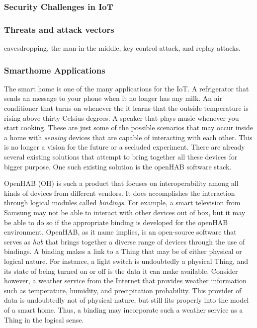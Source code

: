 \documentclass[12pt]{article}
\newcommand{\TODO}{\todo[inline]}
\begin{document}
\subsubsection{Security Challenges in IoT}

\subsubsection{Threats and attack vectors}

eavesdropping, the man-in-the middle, key control attack, and replay attacks.

\TODO{IoT Applications: smarthome, etc}

\subsubsection{Smarthome Applications}

The smart home is one of the many applications for the IoT. A refrigerator that sends an message to your phone when it no longer has any milk. An air conditioner that turns on whenever the it learns that the outside temperature is rising above thirty Celsius degrees. A speaker that plays music whenever you start cooking. These are just some of the possible scenarios that may occur inside a home with \emph{sensing} devices that are capable of interacting with each other. This is no longer a vision for the future or a secluded experiment. There are already several existing solutions that attempt to bring together all these devices for bigger purpose. One such existing solution is the openHAB software stack.

OpenHAB (OH) is such a product that focuses on interoperability among all kinds of devices from different vendors. It does accomplishes the interaction through logical modules called \emph{bindings}. For example, a smart television from Samsung may not be able to interact with other devices out of box, but it may be able to do so if the appropriate binding is developed for the openHAB environment. OpenHAB, as it name implies, is an open-source software that serves as \emph{hub} that brings together a diverse range of devices through the use of bindings. A binding makes a link to a Thing that may be of either physical or logical nature. For instance, a light switch is undoubtedly a physical Thing, and its state of being turned on or off is the data it can make available. Consider however, a weather service from the Internet that provides weather information such as temperature, humidity, and precipitation probability. This provider of data is undoubtedly not of physical nature, but still fits properly into the model of a smart home. Thus, a binding may incorporate such a weather service as a Thing in the logical sense.
\end{document}
